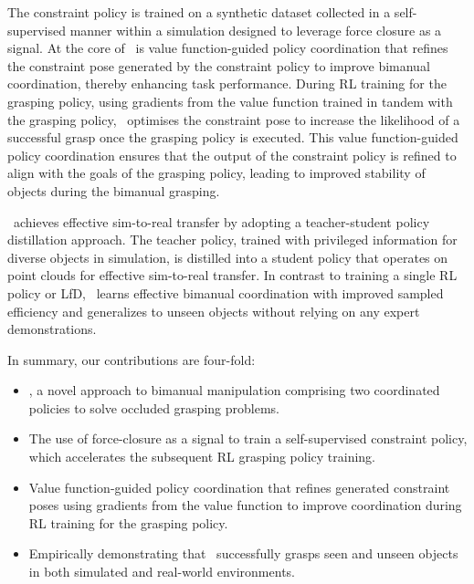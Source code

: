 The constraint policy is trained on a synthetic dataset collected in a self-supervised manner within a simulation designed to leverage force closure as a signal.
At the core of \ourmethod~is value function-guided policy coordination that refines the constraint pose generated by the constraint policy to improve bimanual coordination, thereby enhancing task performance. 
During RL training for the grasping policy, using gradients from the value function trained in tandem with the grasping policy, \ourmethod~optimises the constraint pose to increase the likelihood of a successful grasp once the grasping policy is executed.
This value function-guided policy coordination ensures that the output of the constraint policy is refined to align with the goals of the grasping policy, leading to improved stability of objects during the bimanual grasping.

\ourmethod~achieves effective sim-to-real transfer by adopting a teacher-student policy distillation approach.
The teacher policy, trained with privileged information for diverse objects in simulation, is distilled into a student policy that operates on point clouds for effective sim-to-real transfer. 
In contrast to training a single RL policy or LfD, \ourmethod~learns effective bimanual coordination with improved sampled efficiency and generalizes to unseen objects without relying on any expert demonstrations.

In summary, our contributions are four-fold: 
\begin{itemize}
    \item \ourmethod, a novel approach to bimanual manipulation comprising two coordinated policies to solve occluded grasping problems.
    \item The use of force-closure as a signal to train a self-supervised constraint policy, which accelerates the subsequent RL grasping policy training.
     \item Value function-guided policy coordination that refines generated constraint poses using gradients from the value function to improve coordination during RL training for the grasping policy.
    \item Empirically demonstrating that \ourmethod~successfully grasps seen and unseen objects in both simulated and real-world environments.
\end{itemize}

